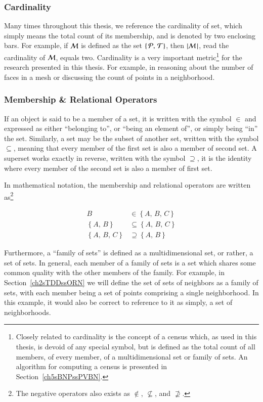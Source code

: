 %
%
\subsubsection{Cardinality}
\label{ch2sETBssSTsssC}
Many times throughout this thesis, we reference the cardinality of set, which simply means the total count of its membership, and is denoted by two enclosing bars. For example, if $\mathcal{M}$ is defined as the set $\left \{\,\mathcal{P},\,\mathcal{T}\right \}$, then $|\mathcal{M}\,| $, read the cardinality of $\mathcal{M}$, equals two. Cardinality is a very important metric\footnote{Closely related to cardinality is the concept of a census which, as used in this thesis, is devoid of any special symbol, but is defined as the total count of all members, of every member, of a multidimensional set or family of sets. An algorithm for computing a census is presented in Section~\ref{ch5sBNPssPVBN}.} for the research presented in this thesis. For example, in reasoning about the number of faces in a mesh or discussing the count of points in a neighborhood.

%
%
\subsubsection{Membership \& Relational Operators}
\label{ch2sETBssSTsssMRO}
If an object is said to be a member of a set, it is written with the symbol $\in$ and expressed as either ``belonging to'', or ``being an element of'', or simply being ``in'' the set. Similarly, a set may be the subset of another set, written with the symbol $\subseteq$, meaning that every member of the first set is also a member of second set. A superset works exactly in reverse, written with the symbol $\supseteq$, it is the identity where every member of the second set is also a member of first set.

In mathematical notation, the membership and relational operators are written as\footnote{The negative operators also exists as $\notin$, $\nsubseteq$, and $\nsupseteq$.}

\begin{align}
	B & \in \left \{A,\,B,\,C\right \} \\
	\left \{A,\,B\right \} & \subseteq \left \{A,\,B,\,C\right \} \\
	\left \{A,\,B,\,C\right \} & \supseteq \left \{A,\,B\right \}
\end{align}

Furthermore, a ``family of sets'' is defined as a multidimensional set, or rather, a set of sets. In general, each member of a family of sets is a set which shares some common quality with the other members of the family. For example, in Section~\ref{ch2sTDDssORN} we will define the set of sets of neighbors as a family of sets, with each member being a set of points comprising a single neighborhood. In this example, it would also be correct to reference to it as simply, a set of neighborhoods.

